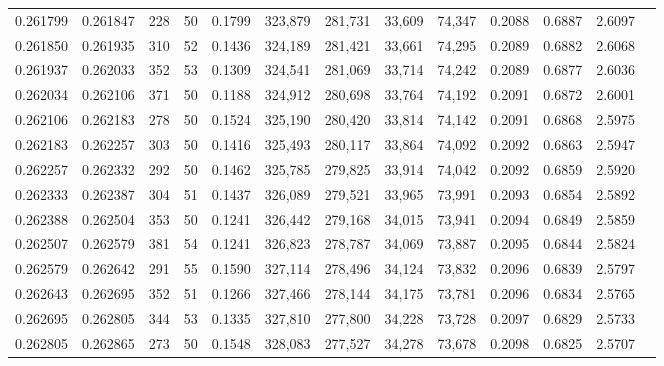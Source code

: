 \begin{tabular}{rrrrrrrrrrrrr}
0.261799 & 0.261847 &   228 &  50 &                                     0.1799 & 323,879 & 281,731 &  33,609 &  74,347 & 0.2088 & 0.6887 & 2.6097 \\
0.261850 & 0.261935 &   310 &  52 &                                     0.1436 & 324,189 & 281,421 &  33,661 &  74,295 & 0.2089 & 0.6882 & 2.6068 \\
0.261937 & 0.262033 &   352 &  53 &                                     0.1309 & 324,541 & 281,069 &  33,714 &  74,242 & 0.2089 & 0.6877 & 2.6036 \\
0.262034 & 0.262106 &   371 &  50 &                                     0.1188 & 324,912 & 280,698 &  33,764 &  74,192 & 0.2091 & 0.6872 & 2.6001 \\
0.262106 & 0.262183 &   278 &  50 &                                     0.1524 & 325,190 & 280,420 &  33,814 &  74,142 & 0.2091 & 0.6868 & 2.5975 \\
0.262183 & 0.262257 &   303 &  50 &                                     0.1416 & 325,493 & 280,117 &  33,864 &  74,092 & 0.2092 & 0.6863 & 2.5947 \\
0.262257 & 0.262332 &   292 &  50 &                                     0.1462 & 325,785 & 279,825 &  33,914 &  74,042 & 0.2092 & 0.6859 & 2.5920 \\
0.262333 & 0.262387 &   304 &  51 &                                     0.1437 & 326,089 & 279,521 &  33,965 &  73,991 & 0.2093 & 0.6854 & 2.5892 \\
0.262388 & 0.262504 &   353 &  50 &                                     0.1241 & 326,442 & 279,168 &  34,015 &  73,941 & 0.2094 & 0.6849 & 2.5859 \\
0.262507 & 0.262579 &   381 &  54 &                                     0.1241 & 326,823 & 278,787 &  34,069 &  73,887 & 0.2095 & 0.6844 & 2.5824 \\
0.262579 & 0.262642 &   291 &  55 &                                     0.1590 & 327,114 & 278,496 &  34,124 &  73,832 & 0.2096 & 0.6839 & 2.5797 \\
0.262643 & 0.262695 &   352 &  51 &                                     0.1266 & 327,466 & 278,144 &  34,175 &  73,781 & 0.2096 & 0.6834 & 2.5765 \\
0.262695 & 0.262805 &   344 &  53 &                                     0.1335 & 327,810 & 277,800 &  34,228 &  73,728 & 0.2097 & 0.6829 & 2.5733 \\
0.262805 & 0.262865 &   273 &  50 &                                     0.1548 & 328,083 & 277,527 &  34,278 &  73,678 & 0.2098 & 0.6825 & 2.5707 \\

\end{tabular}
